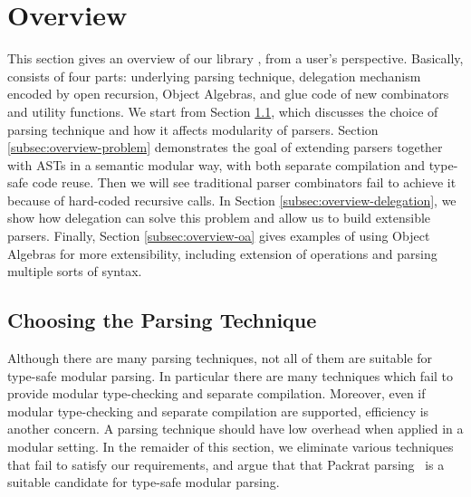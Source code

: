\section{Overview}\label{sec:overview}

This section gives an overview of our library \name, from a user's perspective. Basically, \name consists of four parts: underlying parsing technique, delegation mechanism encoded by open recursion, Object Algebras, and glue code of new combinators and utility functions. We start from Section \ref{subsec:overview-parsing}, which discusses the choice of parsing technique and how it affects modularity of parsers. Section \ref{subsec:overview-problem} demonstrates the goal of extending parsers together with ASTs in a semantic modular way, with both separate compilation and type-safe code reuse. Then we will see traditional parser combinators fail to achieve it because of hard-coded recursive calls. In Section \ref{subsec:overview-delegation}, we show how delegation can solve this problem and allow us to build extensible parsers. Finally, Section \ref{subsec:overview-oa} gives examples of using Object Algebras for more extensibility, including extension of operations and parsing multiple sorts of syntax.

 


\subsection{Choosing the Parsing Technique}\label{subsec:overview-parsing}


Although there are many parsing techniques, not all of them are
suitable for type-safe modular parsing. In particular there are many
techniques which fail to provide modular type-checking and separate
compilation. Moreover, even if modular type-checking and separate
compilation are supported, efficiency is another
concern. A parsing technique should have low overhead when applied
in a modular setting. In the remaider of this section, we eliminate
various techniques that fail to satisfy our requirements, and argue
that that Packrat parsing~\cite{Ford2002} is a suitable candidate for
type-safe modular parsing.

